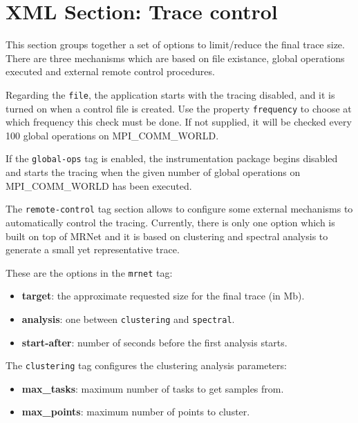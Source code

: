 
\section{XML Section: Trace control}\label{sec:XMLSectionTraceControl}



This section groups together a set of options to limit/reduce the final trace size. There are three mechanisms which are based on file existance, global operations executed and external remote control procedures.

Regarding the {\tt file}, the application starts with the tracing disabled, and it is turned on when a control file is created. Use the property {\tt frequency} to choose at which frequency this check must be done. If not supplied, it will be checked every 100 global operations on MPI\_COMM\_WORLD.

If the {\tt global-ops} tag is enabled, the instrumentation package begins disabled and starts the tracing when the given number of global operations on MPI\_COMM\_WORLD has been executed.

The {\tt remote-control} tag section allows to configure some external mechanisms to automatically control the tracing. Currently, there is only one option which is built on top of MRNet and it is based on clustering and spectral analysis to generate a small yet representative trace.

These are the options in the {\tt mrnet} tag:

\begin{itemize}
 \item {\bf target}: the approximate requested size for the final trace (in Mb).
 \item {\bf analysis}: one between {\tt clustering} and {\tt spectral}.
 \item {\bf start-after}: number of seconds before the first analysis starts.
\end{itemize}

The {\tt clustering} tag configures the clustering analysis parameters:
\begin{itemize}
 \item {\bf max\_tasks}: maximum number of tasks to get samples from.
 \item {\bf max\_points}: maximum number of points to cluster.
\end{itemize}


